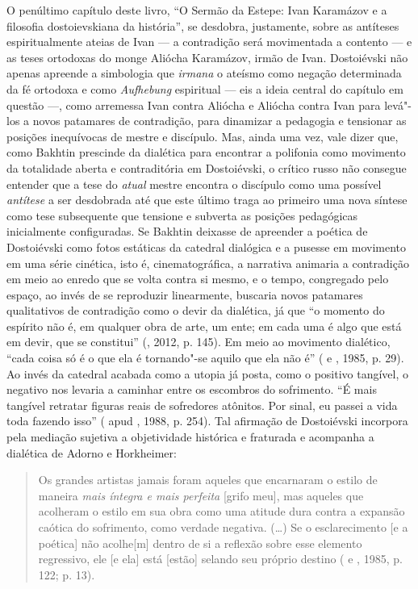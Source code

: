 O penúltimo capítulo deste livro, ``O Sermão da Estepe: Ivan Karamázov e
a filosofia dostoievskiana da história'', se desdobra, justamente, sobre
as antíteses espiritualmente ateias de Ivan --- a contradição será
movimentada a contento --- e as teses ortodoxas do monge Aliócha
Karamázov, irmão de Ivan. Dostoiévski não apenas apreende a simbologia
que \emph{irmana} o ateísmo como negação determinada da fé ortodoxa e
como \emph{Aufhebung} espiritual --- eis a ideia central do capítulo em
questão ---, como arremessa Ivan contra Aliócha e Aliócha contra Ivan
para levá"-los a novos patamares de contradição, para dinamizar a
pedagogia e tensionar as posições inequívocas de mestre e discípulo.
Mas, ainda uma vez, vale dizer que, como Bakhtin prescinde da dialética
para encontrar a polifonia como movimento da totalidade aberta e
contraditória em Dostoiévski, o crítico russo não consegue entender que
a tese do \emph{atual} mestre encontra o discípulo como uma possível
\emph{antítese} a ser desdobrada até que este último traga ao primeiro
uma nova síntese como tese subsequente que tensione e subverta as
posições pedagógicas inicialmente configuradas. Se Bakhtin deixasse de
apreender a poética de Dostoiévski como fotos estáticas da catedral
dialógica e a pusesse em movimento em uma série cinética, isto é,
cinematográfica, a narrativa animaria a contradição em meio ao enredo
que se volta contra si mesmo, e o tempo, congregado pelo espaço, ao
invés de se reproduzir linearmente, buscaria novos patamares
qualitativos de contradição como o devir da dialética, já que ``o
momento do espírito não é, em qualquer obra de arte, um ente; em cada
uma é algo que está em devir, que se constitui'' (, 2012, p. 145).
Em meio ao movimento dialético, ``cada coisa só é o que ela é
tornando"-se aquilo que ela não é'' ( e , 1985, p. 29).
Ao invés da catedral acabada como a utopia já posta, como o positivo
tangível, o negativo nos levaria a caminhar entre os escombros do
sofrimento. ``É mais tangível retratar figuras reais de sofredores
atônitos. Por sinal, eu passei a vida toda fazendo isso'' (
apud , 1988, p. 254). Tal afirmação de Dostoiévski incorpora pela
mediação sujetiva a objetividade histórica e fraturada e acompanha a
dialética de Adorno e Horkheimer:

\begin{quote}
Os grandes artistas jamais foram aqueles que encarnaram o estilo de
maneira \emph{mais íntegra e mais perfeita} {[}grifo meu{]}, mas aqueles
que acolheram o estilo em sua obra como uma atitude dura contra a
expansão caótica do sofrimento, como verdade negativa. (\ldots) Se o
esclarecimento {[}e a poética{]} não acolhe{[}m{]} dentro de si a
reflexão sobre esse elemento regressivo, ele {[}e ela{]} está
{[}estão{]} selando seu próprio destino ( e , 1985, p.
122; p. 13).
\end{quote}

